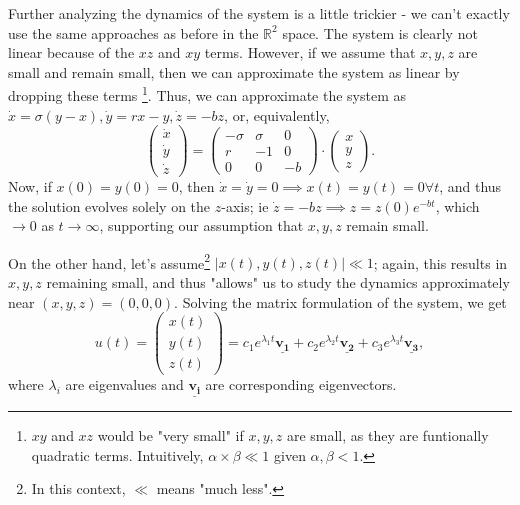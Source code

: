 \documentclass[12pt, oneside]{article}
\begin{document}
Further analyzing the dynamics of the system is a little trickier - we can't exactly use the same approaches as before in the $\mathbb{R}^2$ space. The system is clearly not linear because of the $xz$ and $xy$ terms. However, if we assume that $x, y,z$ are small and remain small, then we can approximate the system as linear by dropping these terms \footnote{$xy$ and $xz$ would be "very small" if $x, y,z$ are small, as they are funtionally quadratic terms. Intuitively, $\alpha \times \beta \ll 1$ given $\alpha, \beta < 1$.}. Thus, we can approximate the system as $\dot{x} = \sigma(y-x), \dot{y} = rx-y, \dot{z} = -bz$, or, equivalently, \[\begin{pmatrix}
  \dot{x}\\
  \dot{y}\\
  \dot{z}
\end{pmatrix} = \begin{pmatrix}
- \sigma &\sigma &0\\
r & -1 & 0\\
0 & 0 & -b
\end{pmatrix}\cdot \begin{pmatrix}
  x\\
  y\\
  z
\end{pmatrix}.\] Now, if $x(0) = y(0) = 0$, then $\dot{x}=\dot{y} = 0 \implies x(t) = y(t) = 0 \forall t$, and thus the solution evolves solely on the $z$-axis; ie $\dot{z} = -b z \implies z = z(0)e^{-bt}$, which $\to 0$ as $t \to\infty$, supporting our assumption that $x,y,z$ remain small. 

On the other hand, let's assume\footnote{In this context, $\ll$ means "much less".} $|x(t), y(t),z(t)|\ll 1$; again, this results in $x,y,z$ remaining small, and thus "allows" us to study the dynamics approximately near $(x,y,z) = (0,0,0)$. Solving the matrix formulation of the system, we get \[u(t) = \begin{pmatrix}
  x(t)\\
  y(t)\\
  z(t)\end{pmatrix} = c_1 e^{\lambda_1 t} \underline{\mathbf{v_1}} + c_2 e^{\lambda_2 t} \underline{\mathbf{v_2}} + c_3 e^{\lambda_3 t} \underline{\mathbf{v_3}},
\] where $\lambda_i$ are eigenvalues and $\underline{\mathbf{v_i}}$ are corresponding eigenvectors.
\end{document}
